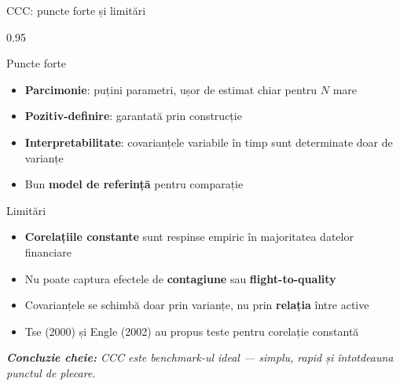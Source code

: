 \documentclass[9pt, aspectratio=169, t]{beamer}
\begin{document}
\begin{frame}{CCC: puncte forte și limitări}
    \begin{cminipage}{0.95\textwidth}
    {\footnotesize
    \begin{block}{Puncte forte}
        \begin{itemize}\setlength{\itemsep}{0pt}
            \item \textbf{Parcimonie}: puțini parametri, ușor de estimat chiar pentru $N$ mare
            \item \textbf{Pozitiv-definire}: garantată prin construcție
            \item \textbf{Interpretabilitate}: covarianțele variabile în timp sunt determinate doar de varianțe
            \item Bun \textbf{model de referință} pentru comparație
        \end{itemize}
    \end{block}
    \vspace{0.2cm}
    \begin{alertblock}{Limitări}
        \begin{itemize}\setlength{\itemsep}{0pt}
            \item \textbf{Corelațiile constante} sunt respinse empiric în majoritatea datelor financiare
            \item Nu poate captura efectele de \textbf{contagiune} sau \textbf{flight-to-quality}
            \item Covarianțele se schimbă doar prin varianțe, nu prin \textbf{relația} între active
            \item Tse (2000) și Engle (2002) au propus teste pentru corelație constantă
        \end{itemize}
    \end{alertblock}
    \textit{\textbf{Concluzie cheie:} CCC este benchmark-ul ideal --- simplu, rapid și întotdeauna punctul de plecare.}
    }
    \end{cminipage}
\end{frame}

\end{document}

